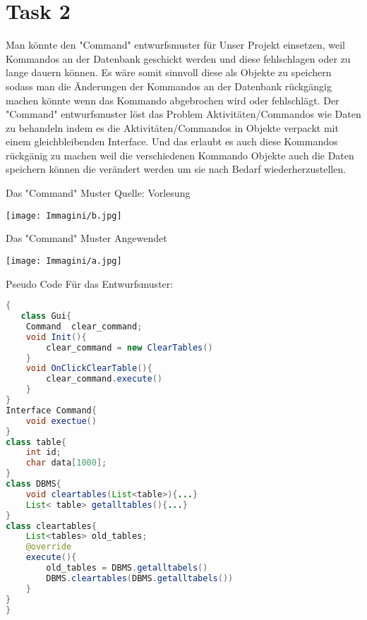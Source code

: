 \chapter{Task 2}
\begin{parlist}
   \item Man könnte den "Command" entwurfsmuster für Unser Projekt einsetzen, weil Kommandos an der Datenbank geschickt werden und diese fehlschlagen oder zu lange dauern können. Es wäre somit sinnvoll diese als Objekte zu speichern sodass man die Änderungen der Kommandos an der Datenbank rückgängig machen könnte wenn das Kommando abgebrochen wird oder fehlschlägt. Der "Command" entwurfsmuster löst das Problem Aktivitäten/Commandos wie Daten zu behandeln indem es die Aktivitäten/Commandos in Objekte verpackt mit einem gleichbleibenden Interface. Und das erlaubt es auch diese Kommandos rückgänig zu machen weil die verschiedenen Kommando Objekte auch die Daten speichern können die verändert werden um sie nach Bedarf wiederherzustellen.
   \item Das "Command" Muster Quelle: Vorlesung
  \begin{center}
   \texttt{[image: Immagini/b.jpg]}
  \end{center}
   \item Das "Command" Muster Angewendet
     \begin{center}
   \texttt{[image: Immagini/a.jpg]}
  \end{center}
   \item Pseudo Code Für das Entwurfsmuster: 
\begin{lstlisting}[language=java, frame=trBL]{
   class Gui{
	Command  clear_command; 
	void Init(){
		clear_command = new ClearTables()
	}
	void OnClickClearTable(){
		clear_command.execute()
	}
}
Interface Command{
	void exectue()
}
class table{
	int id;
	char data[1000];
}
class DBMS{
	void cleartables(List<table>){...}
	List< table> getalltables(){...}
}
class cleartables{
	List<tables> old_tables;
	@override
	execute(){
		old_tables = DBMS.getalltabels()
		DBMS.cleartables(DBMS.getalltabels())
	}
}
}
\end{lstlisting}
\end{parlist}
